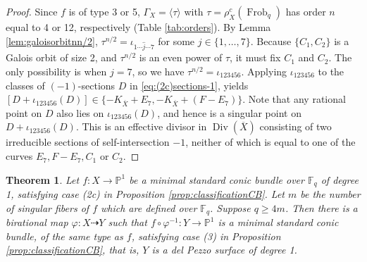 \documentclass[a4paper, 11pt, reqno]{amsart}
\numberwithin{equation}{section} \numberwithin{figure}{section}
\DeclareMathOperator{\Div}{Div}
\DeclareMathOperator{\Frob}{Frob}
\def \F {{\mathbb F}}
\def \P {{\mathbb P}}
\newcommand{\ra}{\rightarrow}
\newtheorem{theorem}[lemma]{Theorem}
\theoremstyle{definition}
\numberwithin{lemma}{section}
\begin{document}
\begin{proof}
    Since $f$ is of type 3 or 5, $\Gamma_X = \langle \tau \rangle$ with $\tau = \rho_X^c(\Frob_q)$ has order $n$ equal to 4 or 12, respectively (Table \ref{tab:orders}). By Lemma \ref{lem:galoisorbitnn/2}, $\tau^{n/2} = \iota_{1 \cdots \hat{j} \cdots 7}$ for some $j \in \{1, \ldots, 7\}$. Because $\{C_1, C_2\}$ is a Galois orbit of size 2, and $\tau^{n/2}$ is an even power of $\tau$, it must fix $C_1$ and $C_2$. The only possibility is when $j = 7$, so we have $\tau^{n/2} = \iota_{123456}$. Applying $\iota_{123456}$ to the classes of $(-1)$-sections $D$ in \eqref{eq:(2c)sections-1}, yields $[D + \iota_{123456}(D)] \in \{-K_{\overline{X}} + E_7, -K_{\overline{X}} + (F-E_7)\}$. Note that any rational point on $D$ also lies on $\iota_{123456}(D)$, and hence is a singular point on $D + \iota_{123456}(D)$. This is an effective divisor in $\Div(\overline{X})$ consisting of two irreducible sections of self-intersection $-1$, neither of which is equal to one of the curves $E_7, F-E_7, C_1$ or $C_2$.
\end{proof}

\begin{theorem}\label{thm:(2c)to(3)}
    Let $f \colon X \ra \P^1$ be a minimal standard conic bundle over $\F_q$ of degree 1, satisfying case (2c) in Proposition \ref{prop:classificationCB}. Let $m$ be the number of singular fibers of $f$ which are defined over $\F_q$. Suppose $q \geq 4m$. Then there is a birational map $\varphi \colon X \dashrightarrow Y$ such that $f \circ \varphi^{-1} \colon Y \ra \P^1$ is a minimal standard conic bundle, of the same type as $f$, satisfying case (3) in Proposition \ref{prop:classificationCB}, that is, $Y$ is a del Pezzo surface of degree 1.
\end{theorem}
\end{document}
